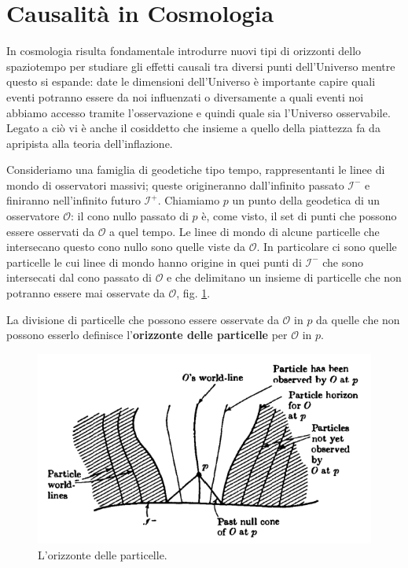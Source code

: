\section{Causalità in Cosmologia}
In cosmologia risulta fondamentale introdurre nuovi tipi di orizzonti dello spaziotempo per studiare gli effetti causali tra diversi punti dell'Universo mentre questo si espande: date le dimensioni dell'Universo è importante capire quali eventi potranno essere da noi influenzati o diversamente a quali eventi noi abbiamo accesso tramite l'osservazione e quindi quale sia l'Universo osservabile. Legato a ciò vi è anche il cosiddetto  che insieme a quello della piattezza fa da apripista alla teoria dell'inflazione.

Consideriamo una famiglia di geodetiche tipo tempo, rappresentanti le linee di mondo di osservatori massivi; queste origineranno dall'infinito passato $\mathcal{I}^-$ e finiranno nell'infinito futuro $\mathcal{I}^+$. Chiamiamo $p$ un punto della geodetica di un osservatore $\mathcal{O}$: il cono nullo passato di $p$ è, come visto, il set di punti che possono essere osservati da $\mathcal{O}$ a quel tempo. Le linee di mondo di alcune particelle che intersecano questo cono nullo sono quelle viste da $\mathcal{O}$. In particolare ci sono quelle particelle le cui linee di mondo hanno origine in quei punti di $\mathcal{I}^-$ che sono intersecati dal cono passato di $\mathcal{O}$ e che delimitano un insieme di particelle che non potranno essere mai osservate da $\mathcal{O}$, fig. \ref{fig.particle_horizon_hawk}.
\begin{definizione}
La divisione di particelle che possono essere osservate da $\mathcal{O}$ in $p$ da quelle che non possono esserlo definisce l'\textbf{orizzonte delle particelle} per $\mathcal{O}$ in $p$.
\end{definizione}
\begin{figure}
    \centering
    \includegraphics[scale=0.75]{immagini/particle_horizon_hawk.png}
    \caption{L'orizzonte delle particelle.}
    \label{fig.particle_horizon_hawk}
\end{figure}

